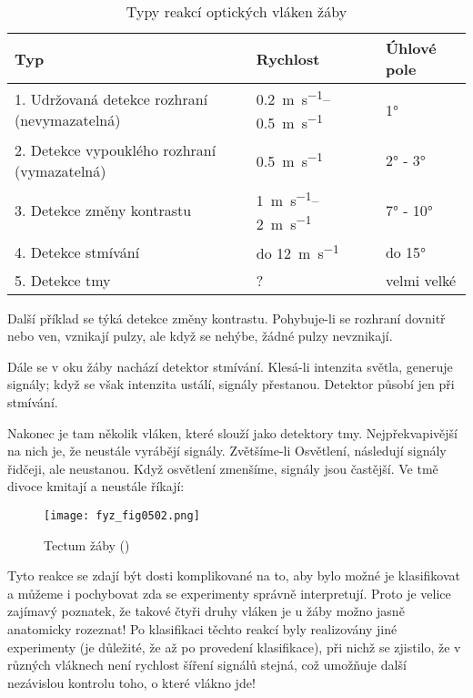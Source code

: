     \begin{table*}[hb!]
      \begin{tabular}{@{}lll@{}}
      \toprule
        \textbf{Typ}                                  & \textbf{Rychlost}            & \textbf{Úhlové pole} \\ \midrule
        1. Udržovaná detekce rozhraní (nevymazatelná) & \SIrange{0.2}{0.5}{\m\per\s} & \ang{1}              \\
        2. Detekce vypouklého rozhraní (vymazatelná)  & \qty{0.5}{\m\per\s}           & \ang{2} - \ang{3}    \\
        3. Detekce změny kontrastu                    & \SIrange{1}{2}{\m\per\s}     & \ang{7} - \ang{10}   \\
        4. Detekce stmívání                           & do \qty{12}{\m\per\s}         & do \ang{15}          \\
        5. Detekce tmy                                & ?                            & velmi velké          \\ \bottomrule
      \end{tabular}
      \caption{Typy reakcí optických vláken žáby}
    \end{table*}

    Další příklad se týká detekce změny kontrastu. Pohybuje-li se rozhraní dovnitř nebo ven,
    vznikají pulzy, ale když se nehýbe, žádné pulzy nevznikají. 
    
    Dále se v oku žáby nachází detektor stmívání. Klesá-li intenzita světla, generuje signály; když
    se však intenzita ustálí, signály přestanou. Detektor působí jen při stmívání.

    Nakonec je tam několik vláken, které slouží jako detektory tmy. Nejpřekvapivější na nich je, že
    neustále vyrábějí signály. Zvětšíme-li Osvětlení, následují signály řidčeji, ale neustanou. Když
    osvětlení zmenšíme, signály jsou častější. Ve tmě divoce kmitají a neustále říkají: 

    \begin{figure}[ht!] %
      \centering
      \texttt{[image: fyz\_fig0502.png]}
      \caption{Tectum žáby (\cite[s.~697]{Feynman01})}
      \label{fyz:fig0502}
    \end{figure}

    Tyto reakce se zdají být dosti komplikované na to, aby bylo možné je klasifikovat a můžeme i
    pochybovat zda se experimenty správně interpretují. Proto je velice zajímavý poznatek, že takové
    čtyři druhy vláken je u žáby možno jasně anatomicky rozeznat! Po klasifikaci těchto reakcí byly
    realizovány jiné experimenty (je důležité, že až po provedení klasifikace), při nichž se
    zjistilo, že v různých vláknech není rychlost šíření signálů stejná, což umožňuje další
    nezávislou kontrolu toho, o které vlákno jde!
    
